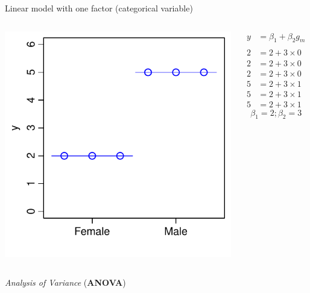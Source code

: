 \documentclass[xcolor=x11names,compress]{beamer}
\renewcommand{\(}{\begin{columns}}
\renewcommand{\)}{\end{columns}}
\newcommand{\<}[1]{\begin{column}{#1}}
\renewcommand{\>}{\end{column}}
\begin{document}
\begin{frame}{Linear model with one factor (categorical variable)}

    \begin{columns}[T]
    
            \includegraphics[width=\textwidth]{Factor.pdf}
            
            \begin{align*}
              y  &= \beta_1 + \beta_2 g_m  \\
              \\
              2  &= 2 + 3 \times 0 \\
              2  &= 2 + 3 \times 0 \\
              2  &= 2 + 3 \times 0 \\
              5  &= 2 + 3 \times 1 \\  
              5  &= 2 + 3 \times 1 \\
              5  &= 2 + 3 \times 1
            \end{align*}
            \[\beta_1 = 2; \beta_2=3\]
    \end{columns}
    \pause
    \begin{center}
        {\it Analysis of Variance} ({\bf ANOVA})
    \end{center}

\end{frame}
    
\end{document}
